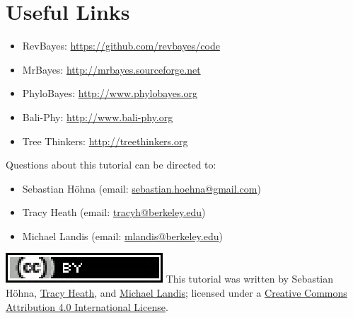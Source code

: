 \documentclass[11pt]{article}
\begin{document}
\bigskip
\section*{Useful Links}

\begin{itemize}
\item RevBayes: \href{https://github.com/revbayes/code}{https://github.com/revbayes/code} \\ \vspace{-7mm}
\item MrBayes: \href{http://mrbayes.sourceforge.net/}{http://mrbayes.sourceforge.net} \\ \vspace{-7mm}
\item PhyloBayes: \href{http://megasun.bch.umontreal.ca/People/lartillot/www/index.htm}{http://www.phylobayes.org} \\ \vspace{-7mm}
\item Bali-Phy: \href{http://www.bali-phy.org/}{http://www.bali-phy.org} \\ \vspace{-7mm}
\item Tree Thinkers: \href{http://treethinkers.org/}{http://treethinkers.org} \\ \vspace{-7mm}
\end{itemize}

Questions about this tutorial can be directed to: \\\vspace{-10mm}
\begin{itemize}
\item Sebastian H\"{o}hna (email: \href{mailto:sebastian.hoehna@gmail.com}{sebastian.hoehna@gmail.com})
\item Tracy Heath (email: \href{mailto:tracyh@berkeley.edu}{tracyh@berkeley.edu}) \\\vspace{-8mm}
\item Michael Landis (email: \href{mailto:mlandis@berkeley.edu}{mlandis@berkeley.edu}) \\\vspace{-8mm} 
\end{itemize}

\href{http://creativecommons.org/licenses/by/4.0/}{\includegraphics[scale=0.8]{figures/ccby.eps}} This tutorial was written by Sebastian H\"{o}hna, \href{http://phylo.bio.ku.edu/content/tracy-heath}{Tracy Heath}, and \href{http://michaeljameslandis.com/}{Michael Landis}; licensed under a \href{http://creativecommons.org/licenses/by/4.0/}{Creative Commons Attribution 4.0 International License}. 
\end{document}
